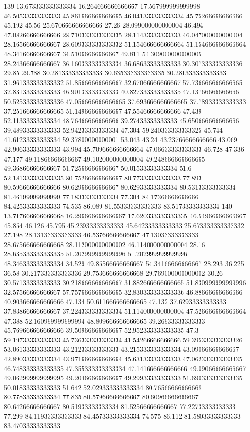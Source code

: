 139 13.673333333333334 16.264666666666667 17.567999999999998 46.50533333333333 45.861666666666665 46.041333333333334 45.75266666666666 45.192 45.56 25.670666666666666 27.26 28.099000000000004 46.494 47.08266666666666 28.710333333333335 28.11433333333333 46.047000000000004 28.16566666666667 28.609333333333332 51.154666666666664 51.154666666666664 48.34166666666667 34.51066666666667 49.811 54.309000000000005 28.24366666666667 36.160333333333334 36.68633333333333 30.307333333333336 29.85 29.788 30.281333333333333 30.635333333333335 30.281333333333333 31.961333333333332 51.85666666666667 32.67066666666667 57.736666666666665 32.83133333333333 46.90133333333333 40.827333333333335 47.13766666666666 50.525333333333336 47.056666666666665 37.693666666666665 37.78933333333333 37.251666666666665 51.14966666666667 47.55466666666666 47.439 52.11333333333334 48.76466666666666 39.27433333333333 45.650666666666666 39.48933333333333 52.94233333333334 47.304 59.240333333333325 45.744 41.61233333333334 59.37800000000001 53.043 43.24 43.23766666666666 43.069 42.90633333333333 43.994 45.709666666666664 47.06633333333333 46.728 47.336 47.177 49.11866666666667 49.102000000000004 49.248666666666665 49.36866666666667 51.72566666666667 50.01533333333334 51.6 52.181333333333335 80.75266666666667 80.77333333333333 77.893 80.59666666666666 80.62966666666667 80.62933333333334 80.53133333333334 81.46199999999999 77.18333333333334 77.304 84.17366666666666 84.42533333333333 74.535 86.089 81.55333333333333 83.51733333333334
140 13.717666666666668 16.296666666666667 17.620333333333335 46.54966666666667 45.854 46.126 45.795 45.23933333333333 45.64233333333333 25.673333333333332 27.198 28.13133333333333 46.53766666666667 47.13033333333333 28.675666666666668 28.112000000000002 46.114000000000004 28.16 28.635333333333335 51.202999999999996 51.202999999999996 48.346333333333334 34.529 49.85566666666667 54.34166666666667 28.293 36.225 36.58 30.217333333333336 29.753666666666668 29.769000000000002 30.26 30.57133333333333 30.218666666666667 31.882666666666665 51.830999999999996 32.57566666666667 57.757666666666665 32.830333333333336 46.88666666666666 40.903666666666666 47.134 50.611666666666665 47.132 37.62933333333333 37.83866666666667 37.224333333333334 51.114000000000004 47.526666666666664 47.388 52.160999999999994 48.809666666666665 39.26933333333333 45.769666666666666 39.50966666666667 52.952333333333335 47.3 59.19733333333333 45.736333333333334 41.54266666666666 59.395333333333326 53.06133333333333 43.21233333333333 43.215333333333334 43.09066666666667 42.89033333333334 43.971666666666664 45.63133333333333 47.062333333333335 46.748333333333335 47.355333333333334 47.141666666666666 49.09066666666667 49.062999999999995 49.20466666666667 49.29933333333333 51.690333333333335 50.01833333333333 51.642 52.029333333333334 80.76566666666668 80.77833333333334 77.835 80.57966666666667 80.60966666666667 80.64266666666667 80.51933333333334 81.52566666666667 77.22733333333333 77.299 84.11933333333333 84.45733333333334 74.575 86.112 81.58033333333333 83.47033333333333
